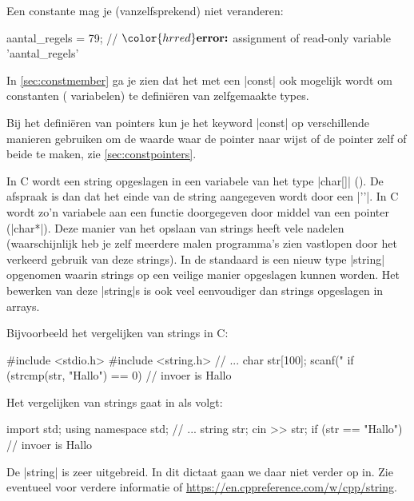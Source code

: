 \begin{cpplstShortInline}
Een constante mag je (vanzelfsprekend) niet veranderen:
\begin{cpplstfragment}[mathescape=true]
aantal_regels = 79;
//  $\color{hrred}\textbf{error:}$ assignment of read-only variable 'aantal_regels'
\end{cpplstfragment}

In \cref{sec:constmember} ga je zien dat het met een |const|  ook mogelijk wordt om constanten ( variabelen) te definiëren van zelfgemaakte types.

Bij het definiëren van pointers kun je het keyword |const| op verschillende manieren gebruiken om de waarde waar de pointer naar wijst of de pointer zelf of beide  te maken, zie \cref{sec:constpointers}.

\label{sec:string}
In C wordt een  string opgeslagen in een variabele van het type |char[]| ().
De afspraak is dan dat het einde van de  string aangegeven wordt door een  |'\0'|.
In C wordt zo'n variabele aan een functie doorgegeven door middel van een  pointer (|char*|).
Deze manier van het opslaan van  strings heeft vele nadelen (waarschijnlijk heb je zelf meerdere malen programma's zien vastlopen door het verkeerd gebruik van deze  strings).
In de standaard \Cpp{}  is een nieuw type |string| opgenomen waarin  strings op een veilige manier opgeslagen kunnen worden.
Het bewerken van deze |string|s is ook veel eenvoudiger dan strings opgeslagen in  arrays.

Bijvoorbeeld het vergelijken van  strings in C:
\begin{cpplstfragment}
#include <stdio.h>
#include <string.h>
//  ...
    char str[100];
    scanf("%
    if (strcmp(str, "Hallo") == 0) {
        // invoer is Hallo
    }
\end{cpplstfragment}

Het vergelijken van strings gaat in \Cpp{} als volgt:
\begin{cpplstfragment}
import std;
using namespace std;
//  ...
    string str;
    cin >> str;
    if (str == "Hallo") {
        // invoer is Hallo
    }
\end{cpplstfragment}

De |string|  is zeer uitgebreid.
In dit dictaat gaan we daar niet verder op in.
Zie eventueel voor verdere informatie \cite[hoofdstuk 5: \href{http://www.icce.rug.nl/documents/cplusplus/cplusplus05.html}{String}]{Brokken2019} of \url{https://en.cppreference.com/w/cpp/string}.


\end{cpplstShortInline}
